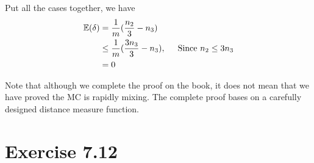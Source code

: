 \documentclass{article}
\begin{document}
Put all the cases together, we have
\begin{align*}
  \mathbb{E}(\delta) &= \frac{1}{m}(\frac{n_2}{3} - n_3) \\
  &\leq \frac{1}{m}(\frac{3n_3}{3} - n_3), \hspace{0.5cm} \mbox{Since $n_2\leq 3n_3$} \\
  &= 0
\end{align*}

\begin{tcolorbox}[title={Note}]
Note that although we complete the proof on the book, it does not mean that we have proved the MC is rapidly mixing. The complete proof bases on a carefully designed distance measure function.
\end{tcolorbox}

\section{Exercise 7.12}
\end{document}

